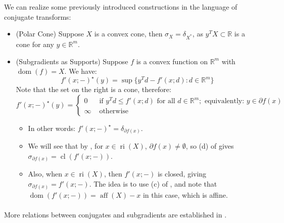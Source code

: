 \begin{exmp}We can realize some previously introduced constructions in the language of conjugate transforms:
	\begin{itemize}
		\item (Polar Cone) Suppose $X$ is a convex cone, then $\sigma_X=\delta_{X^\ast}$, as $y^TX\subset \mathbb{R}$ is a cone for any $y\in \mathbb{R}^m$.
		\item (Subgradients as Supports) Suppose $f$ is a convex function on $\mathbb{R}^m$ with $\operatorname{dom}(f)=X$. We have:
		      \[
			      f'(x;-)^\star(y) = \sup \{y^Td - f'(x; d):d\in \mathbb{R}^m\}
		      \]
		      Note that the set on the right is a cone, therefore:
		      \[
			      f'(x;-)^\star(y) = \begin{cases}
				      0      & \text{ if }y^Td \leq f'(x;d)\text{ for all }d\in \mathbb{R}^m;\text{ equivalently: }y\in\partial f(x) \\
				      \infty & \text{ otherwise}
			      \end{cases}
		      \]
		      \begin{itemize}
			      \item In other words: $f'(x;-)^\star = \delta_{\partial f(x)}$.
			      \item We will see that by , for $x\in \operatorname{ri}(X)$, $\partial f(x)\neq\emptyset$, so (d) of  gives $\sigma_{\partial f(x)}=\operatorname{cl}(f'(x;-))$.
			      \item Also, when $x\in \operatorname{ri}(X)$, then $f'(x;-)$ is closed, giving $\sigma_{\partial f(x)}=f'(x;-)$. The idea is to use (c) of , and note that $\operatorname{dom}(f'(x;-))=\operatorname{aff}(X)-x$ in this case, which is affine.
		      \end{itemize}
	\end{itemize}
\end{exmp}

\paragraph{}More relations between conjugates and subgradients are established in .

